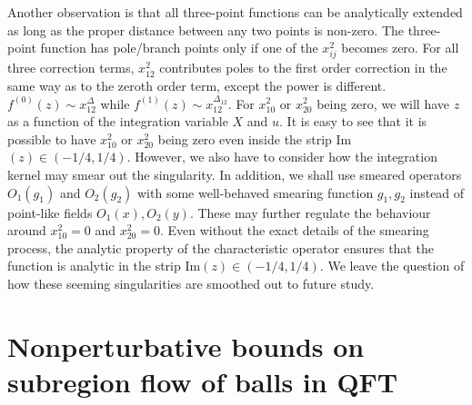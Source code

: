 \documentclass[a4paper,11pt]{article}
\theoremstyle{definition}
\theoremstyle{remark}
\begin{document}
Another observation is that all three-point functions can be analytically extended as long as the proper distance between any two points is non-zero. The three-point function has pole/branch points only if one of the $x_{ij}^2$ becomes zero. For all three correction terms, $x_{12}^2$ contributes poles to the first order correction in the same way as to the zeroth order term, except the power is different. $f^{(0)}(z) \sim x_{12}^{\Delta}$ while $f^{(1)}(z) \sim x_{12}^{\Delta_{12}}$. For $x_{10}^2 $ or $ x_{20}^2$ being zero, we will have $z$ as a function of the integration variable $X$ and $u$. It is easy to see that it is possible to have $x_{10}^2 $ or $ x_{20}^2$ being zero even inside the strip Im$(z) \in (-1/4,1/4)$. However, we also have to consider how the integration kernel may smear out the singularity. In addition, we shall use smeared operators $O_1(g_1)$ and $O_2(g_2)$ with some well-behaved smearing function $g_1,g_2$ instead of point-like fields $O_1(x), O_2(y)$. These may further regulate the behaviour around $x_{10}^2 = 0$ and $x_{20}^2=0$. Even without the exact details of the smearing process, the analytic property of the characteristic operator ensures that the function is analytic in the strip Im$(z) \in (-1/4,1/4)$. We leave the question of how these seeming singularities are smoothed out to future study. 






\section{Nonperturbative bounds on subregion flow of balls in QFT}\label{section:approx}
\end{document}
